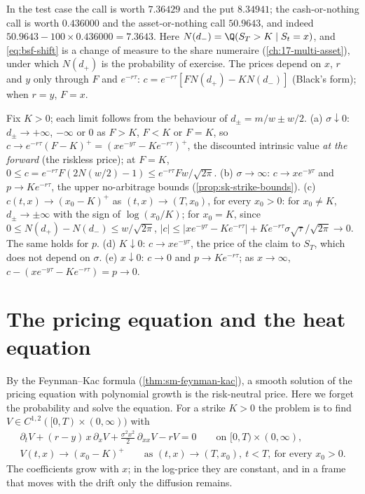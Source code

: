In the test case the call is worth $7.36429$ and the put $8.34941$; the cash-or-nothing call is
worth $0.436000$ and the asset-or-nothing call $50.9643$, and indeed $50.9643-100\times0.436000=7.3643$.
Here $N(d_-)=\Q(S_T>K\mid S_t=x)$, and \eqref{eq:bsf-shift} is a change of measure to the share numeraire
(\cref{ch:17-multi-asset}), under which $N(d_+)$ is the probability of exercise. The prices depend on $x$, $r$
and $y$ only through $F$ and $e^{-r\tau}$: $c=e^{-r\tau}[FN(d_+)-KN(d_-)]$ (Black's form); when $r=y$, $F=x$.


\begin{remark}\label{rem:bsf-limits}
Fix $K>0$; each limit follows from the behaviour of $d_\pm=m/w\pm w/2$.
(a) $\sigma\downarrow0$: $d_\pm\to+\infty$, $-\infty$ or $0$ as $F>K$, $F<K$ or $F=K$, so
$c\to e^{-r\tau}(F-K)^+=(xe^{-y\tau}-Ke^{-r\tau})^+$, the discounted intrinsic value \emph{at the forward}
(the riskless price); at $F=K$, $0\le c=e^{-r\tau}F(2N(w/2)-1)\le e^{-r\tau}Fw/\sqrt{2\pi}$.
(b) $\sigma\to\infty$: $c\to xe^{-y\tau}$ and $p\to Ke^{-r\tau}$, the upper no-arbitrage bounds
(\cref{prop:sk-strike-bounds}).
(c) $c(t,x)\to(x_0-K)^+$ as $(t,x)\to(T,x_0)$, for every $x_0>0$: for $x_0\ne K$, $d_\pm\to\pm\infty$ with the
sign of $\log(x_0/K)$; for $x_0=K$, since $0\le N(d_+)-N(d_-)\le w/\sqrt{2\pi}$,
$|c|\le|xe^{-y\tau}-Ke^{-r\tau}|+Ke^{-r\tau}\sigma\sqrt\tau/\sqrt{2\pi}\to0$. The same holds for $p$.
(d) $K\downarrow0$: $c\to xe^{-y\tau}$, the price of the claim to $S_T$, which does not depend on $\sigma$.
(e) $x\downarrow0$: $c\to0$ and $p\to Ke^{-r\tau}$; as $x\to\infty$, $c-(xe^{-y\tau}-Ke^{-r\tau})=p\to0$.
\end{remark}

\section{The pricing equation and the heat equation}\label{sec:bsf-heat}

By the Feynman--Kac formula (\cref{thm:sm-feynman-kac}), a smooth solution of the pricing equation
with polynomial growth is the risk-neutral price. Here we forget the probability and solve the
equation. For a strike $K>0$ the problem is to find $V\in C^{1,2}([0,T)\times(0,\infty))$ with
\begin{gather}
  \partial_tV+(r-y)\,x\,\partial_xV+\frac{\sigma^2x^2}{2}\,\partial_{xx}V-rV=0\qquad\text{on }[0,T)\times(0,\infty),
  \label{eq:bsf-pde}\\
  V(t,x)\to(x_0-K)^+\qquad\text{as }(t,x)\to(T,x_0),\ t<T,\ \text{for every }x_0>0 .\label{eq:bsf-terminal}
\end{gather}
The coefficients grow with $x$; in the log-price they are constant, and in a frame that moves with the
drift only the diffusion remains.

